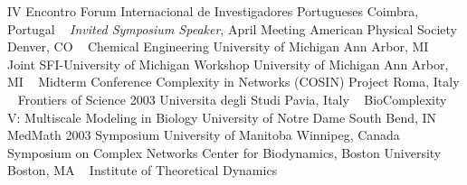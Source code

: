 IV Encontro
\newline
    Forum Internacional de Investigadores Portugueses
    \newline
Coimbra, Portugal
\newline
~
\Gap
{}
\textit{Invited Symposium Speaker}, April Meeting
\newline
    American Physical Society 
    \newline
Denver, CO
\newline
~
\Gap
{}
Chemical Engineering
\newline
    University of Michigan
    \newline
Ann Arbor, MI
\newline
~
\Gap
{}
Joint SFI-University of Michigan Workshop
\newline
    University of Michigan
    \newline
Ann Arbor, MI
\newline
~
\Gap
{}
Midterm Conference
\newline
    Complexity in Networks (COSIN) Project
    \newline
Roma, Italy
\newline
~
\Gap
{}
Frontiers of Science 2003
\newline
    Universita degli Studi
    \newline
Pavia, Italy
\newline
~
\Gap
{}
BioComplexity V: Multiscale Modeling in Biology
\newline
    University of Notre  Dame
    \newline
South Bend, IN
\newline
~
\Gap
{}
MedMath 2003 Symposium
\newline
    University of Manitoba
    \newline
Winnipeg, Canada
\newline
~
\Gap
{}
Symposium on Complex Networks
\newline
    Center for Biodynamics, Boston University
    \newline
Boston, MA
\newline
~
\Gap
{}
Institute of Theoretical Dynamics
\newline
